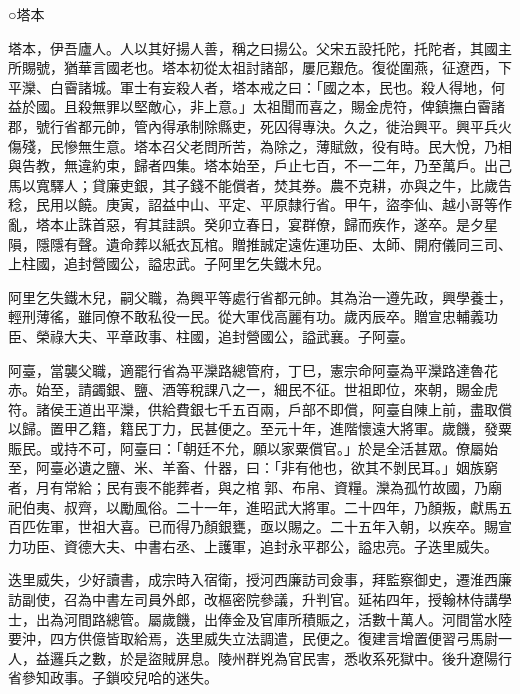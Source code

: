 
\begin{pinyinscope}

 ○塔本



 塔本，伊吾廬人。人以其好揚人善，稱之曰揚公。父宋五設托陀，托陀者，其國主所賜號，猶華言國老也。塔本初從太祖討諸部，屢厄艱危。復從圍燕，征遼西，下平灤、白霫諸城。軍士有妄殺人者，塔本戒之曰：「國之本，民也。殺人得地，何益於國。且殺無罪以堅敵心，非上意。」太祖聞而喜之，賜金虎符，俾鎮撫白霫諸郡，號行省都元帥，管內得承制除縣吏，死囚得專決。久之，徙治興平。興平兵火傷殘，民慘無生意。塔本召父老問所苦，為除之，薄賦斂，役有時。民大悅，乃相與告教，無違約束，歸者四集。塔本始至，戶止七百，不一二年，乃至萬戶。出己馬以寬驛人；貸廉吏銀，其子錢不能償者，焚其券。農不克耕，亦與之牛，比歲告稔，民用以饒。庚寅，詔益中山、平定、平原隸行省。甲午，盜李仙、越小哥等作亂，塔本止誅首惡，宥其詿誤。癸卯立春日，宴群僚，歸而疾作，遂卒。是夕星隕，隱隱有聲。遺命葬以紙衣瓦棺。贈推誠定遠佐運功臣、太師、開府儀同三司、上柱國，追封營國公，謚忠武。子阿里乞失鐵木兒。



 阿里乞失鐵木兒，嗣父職，為興平等處行省都元帥。其為治一遵先政，興學養士，輕刑薄徭，雖同僚不敢私役一民。從大軍伐高麗有功。歲丙辰卒。贈宣忠輔義功臣、榮祿大夫、平章政事、柱國，追封營國公，謚武襄。子阿臺。



 阿臺，當襲父職，適罷行省為平灤路總管府，丁巳，憲宗命阿臺為平灤路達魯花赤。始至，請蠲銀、鹽、酒等稅課八之一，細民不征。世祖即位，來朝，賜金虎符。諸侯王道出平灤，供給費銀七千五百兩，戶部不即償，阿臺自陳上前，盡取償以歸。置甲乙籍，籍民丁力，民甚便之。至元十年，進階懷遠大將軍。歲饑，發粟賑民。或持不可，阿臺曰：「朝廷不允，願以家粟償官。」於是全活甚眾。僚屬始至，阿臺必遺之鹽、米、羊畜、什器，曰：「非有他也，欲其不剝民耳。」姻族窮者，月有常給；民有喪不能葬者，與之棺郭、布帛、資糧。灤為孤竹故國，乃廟祀伯夷、叔齊，以勵風俗。二十一年，進昭武大將軍。二十四年，乃顏叛，獻馬五百匹佐軍，世祖大喜。已而得乃顏銀甕，亟以賜之。二十五年入朝，以疾卒。賜宣力功臣、資德大夫、中書右丞、上護軍，追封永平郡公，謚忠亮。子迭里威失。



 迭里威失，少好讀書，成宗時入宿衛，授河西廉訪司僉事，拜監察御史，遷淮西廉訪副使，召為中書左司員外郎，改樞密院參議，升判官。延祐四年，授翰林侍講學士，出為河間路總管。屬歲饑，出俸金及官庫所積賑之，活數十萬人。河間當水陸要沖，四方供億皆取給焉，迭里威失立法調遣，民便之。復建言增置便習弓馬尉一人，益邏兵之數，於是盜賊屏息。陵州群兇為官民害，悉收系死獄中。後升遼陽行省參知政事。子鎖咬兒哈的迷失。




\end{pinyinscope}
